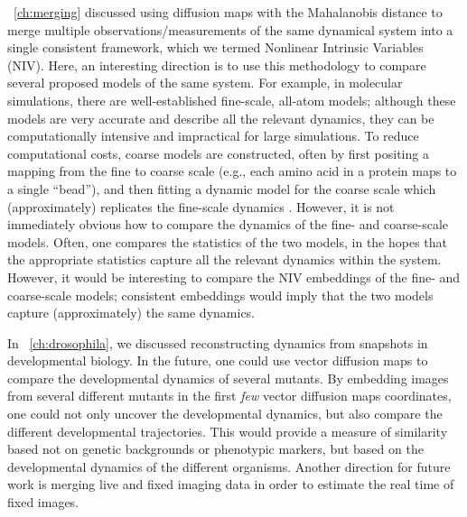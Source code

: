 \chap~\ref{ch:merging} discussed using diffusion maps with the Mahalanobis distance to merge multiple observations/measurements of the same dynamical system into a single consistent framework, which we termed Nonlinear Intrinsic Variables (NIV).
%
Here, an interesting direction is to use this methodology to compare several proposed models of the same system.
%
For example, in molecular simulations, there are well-established fine-scale, all-atom models; although these models are very accurate and describe all the relevant dynamics, they can be computationally intensive and impractical for large simulations.
%
To reduce computational costs, coarse models are constructed, often by first positing a mapping from the fine to coarse scale (e.g., each amino acid in a protein maps to a single ``bead''), and then fitting a dynamic model for the coarse scale which (approximately) replicates the fine-scale dynamics \cite{saunders2013coarse, izvekov2005systematic, chaimovich2011coarse}.
%
However, it is not immediately obvious how to compare the dynamics of the fine- and coarse-scale models.
%
Often, one compares the statistics of the two models, in the hopes that the appropriate statistics capture all the relevant dynamics within the system.
%
However, it would be interesting to compare the NIV embeddings of the fine- and coarse-scale models; consistent embeddings would imply that the two models capture (approximately) the same dynamics.

In \chap~\ref{ch:drosophila}, we discussed reconstructing dynamics from snapshots in developmental biology.
%
In the future, one could use vector diffusion maps to compare the developmental dynamics of several mutants.
%
By embedding images from several different mutants in the first {\em few} vector diffusion maps coordinates, one could not only uncover the developmental dynamics, but also compare the different developmental trajectories.
%
This would provide a measure of similarity based not on genetic backgrounds or phenotypic markers, but based on the developmental dynamics of the different organisms.
%
Another direction for future work is merging live and fixed imaging data in order to estimate the real time of fixed images.

